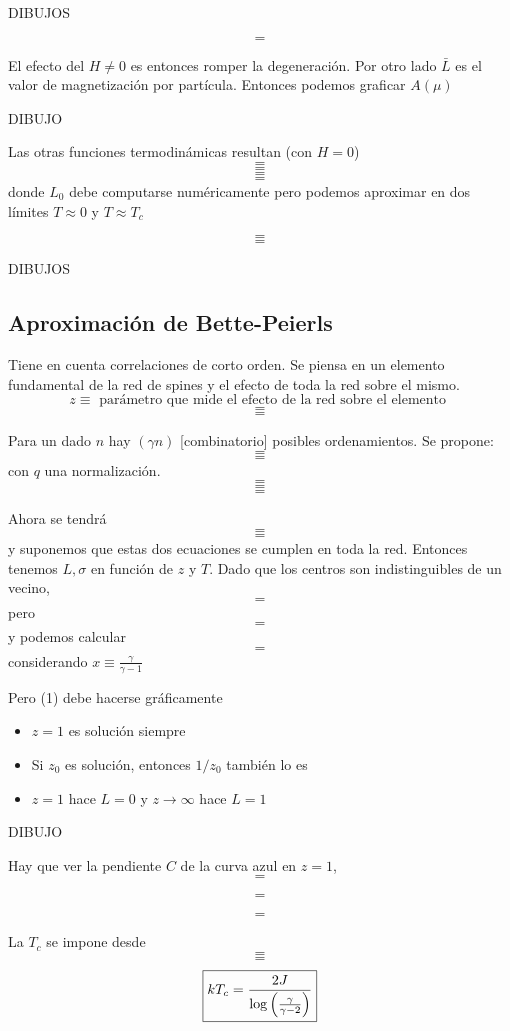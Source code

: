\documentclass[10pt,oneside]{CBFT_book}
\begin{document}
DIBUJOS

\[=\]

El efecto del $H\neq 0$ es entonces romper la degeneración. Por otro lado $\bar{L}$ es el valor de
magnetización por partícula. Entonces podemos graficar $A(\mu)$

DIBUJO

Las otras funciones termodinámicas resultan (con $H=0$)
\[=\]
\[=\]
\[=\]
\[=\]
donde $L_0$ debe computarse numéricamente pero podemos aproximar en dos límites $T\approx 0$ y $T\approx T_c$

\[=\]
\[=\]

DIBUJOS

\subsection{Aproximación de Bette-Peierls}

Tiene en cuenta correlaciones de corto orden. Se piensa en un elemento fundamental de la red de spines y el
efecto de toda la red sobre el mismo.
\[
	z \equiv \text{ parámetro que mide el efecto de la red sobre el elemento }
\]
\[=\]
\[=\]

Para un dado $n$ hay $(\gamma n)$ [combinatorio] posibles ordenamientos.
Se propone:
\[=\]
\[=\]
con $q$ una normalización.
\[=\]
\[=\]
\[=\]

Ahora se tendrá
\[=\]
\[=\]
y suponemos que estas dos ecuaciones se cumplen en toda la red.
Entonces tenemos $L,\sigma$ en función de $z$ y $T$.
Dado que los centros son indistinguibles de un vecino,
\[=\]
pero
\[=\]
y podemos calcular
\[=\]
considerando $x\equiv \frac{\gamma}{\gamma -1}$

Pero (1) debe hacerse gráficamente
\begin{itemize}
 \item $z=1$ es solución siempre 
 \item Si $z_0$ es solución, entonces $1/z_0$ también lo es
 \item $z=1$ hace $L=0$ y $z\to\infty$ hace $L=1$
\end{itemize}

DIBUJO

Hay que ver la pendiente $C$ de la curva azul en $z=1$,
\[=\]

\[=\]

\[=\]

La $T_c$ se impone desde
\[=\]
\[=\]
\[ 
	\boxed{ kT_c = \frac{2J}{\log \left( \frac{ \gamma }{ \gamma -2  } \right) }}
\]
\end{document}
